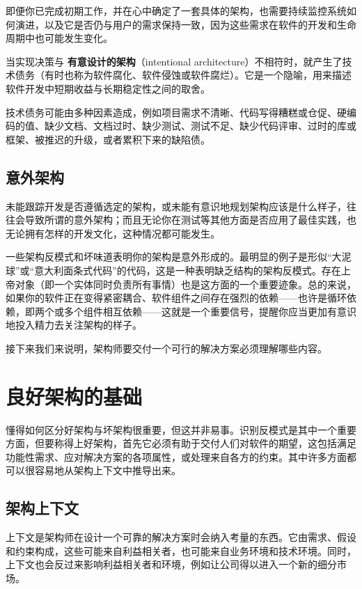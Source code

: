 \label{idx:008}
即便你已完成初期工作，并在心中确定了一套具体的架构，也需要持续监控系统如何演进，以及它是否仍与用户的需求保持一致，因为这些需求在软件的开发和生命周期中也可能发生变化。

\label{idx:009}
当实现决策与 \textbf{有意设计的架构}（intentional architecture）不相符时，就产生了技术债务（有时也称为软件腐化、软件侵蚀或软件腐烂）。它是一个隐喻，用来描述软件开发中短期收益与长期稳定性之间的取舍。

技术债务可能由多种因素造成，例如项目需求不清晰、代码写得糟糕或仓促、硬编码的值、缺少文档、文档过时、缺少测试、测试不足、缺少代码评审、过时的库或框架、被推迟的升级，或者累积下来的缺陷债。

\subsection{意外架构}

\label{idx:010}
\label{idx:011}
未能跟踪开发是否遵循选定的架构，或未能有意识地规划架构应该是什么样子，往往会导致所谓的意外架构；而且无论你在测试等其他方面是否应用了最佳实践，也无论拥有怎样的开发文化，这种情况都可能发生。

一些架构反模式和坏味道表明你的架构是意外形成的。最明显的例子是形似“大泥球”或“意大利面条式代码”的代码，这是一种表明缺乏结构的架构反模式。存在上帝对象（即一个实体同时负责所有事情）也是这方面的一个重要迹象。总的来说，如果你的软件正在变得紧密耦合、软件组件之间存在强烈的依赖——也许是循环依赖，即两个或多个组件相互依赖——这就是一个重要信号，提醒你应当更加有意识地投入精力去关注架构的样子。

接下来我们来说明，架构师要交付一个可行的解决方案必须理解哪些内容。

\section{良好架构的基础}

\label{idx:012}
懂得如何区分好架构与坏架构很重要，但这并非易事。识别反模式是其中一个重要方面，但要称得上好架构，首先它必须有助于交付人们对软件的期望，这包括满足功能性需求、应对解决方案的各项属性，或处理来自各方的约束。其中许多方面都可以很容易地从架构上下文中推导出来。

\subsection{架构上下文}

\label{idx:013}
\label{idx:014}
上下文是架构师在设计一个可靠的解决方案时会纳入考量的东西。它由需求、假设和约束构成，这些可能来自利益相关者，也可能来自业务环境和技术环境。同时，上下文也会反过来影响利益相关者和环境，例如让公司得以进入一个新的细分市场。


